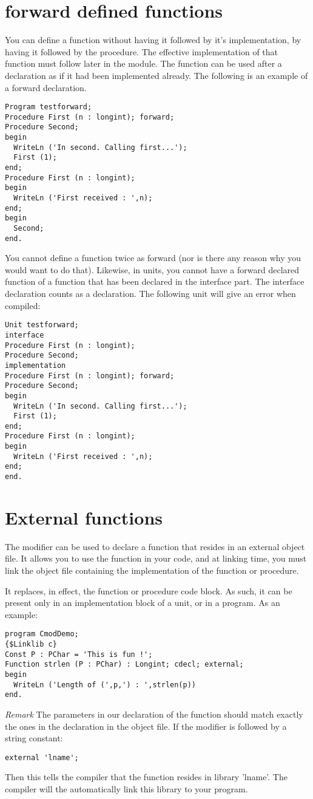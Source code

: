 \documentclass{report}
\begin{document}
\section{forward defined functions}
You can define a function without having it followed by it's implementation,
by having it followed by the  procedure. The effective
implementation of that function must follow later in the module.
The function can be used after a  declaration as if it had been
implemented already.
The following is an example of a forward declaration.
\begin{verbatim}
Program testforward;
Procedure First (n : longint); forward;
Procedure Second;
begin
  WriteLn ('In second. Calling first...');
  First (1);
end;
Procedure First (n : longint);
begin
  WriteLn ('First received : ',n);
end;
begin
  Second;
end.
\end{verbatim}
You cannot define a function twice as forward (nor is there any reason why
you would want to do that).
Likewise, in units, you cannot have a forward declared function of a
function that has been declared in the interface part. The interface
declaration counts as a  declaration.
The following unit will give an error when compiled:
\begin{verbatim}
Unit testforward;
interface
Procedure First (n : longint);
Procedure Second;
implementation
Procedure First (n : longint); forward;
Procedure Second;
begin
  WriteLn ('In second. Calling first...');
  First (1);
end;
Procedure First (n : longint);
begin
  WriteLn ('First received : ',n);
end;
end.
\end{verbatim}
\section{External functions}
\label{se:external}
The  modifier can be used to declare a function that resides in
an external object file. It allows you to use the function in
your code, and at linking time, you must link the object file containing the
implementation of the function or procedure.

It replaces, in effect, the function or procedure code block. As such, it
can be present only in an implementation block of a unit, or in a program.
As an example:
\begin{verbatim}
program CmodDemo;
{$Linklib c}
Const P : PChar = 'This is fun !';
Function strlen (P : PChar) : Longint; cdecl; external;
begin
  WriteLn ('Length of (',p,') : ',strlen(p))
end.
\end{verbatim}
{\em Remark} The parameters in our declaration of the  function
should match exactly the ones in the declaration in the object file.
If the  modifier is followed by a string constant:
\begin{verbatim}
external 'lname';
\end{verbatim}
Then this tells the compiler that the function resides in library
'lname'. The compiler will the automatically link this library to
your program.
\end{document}
